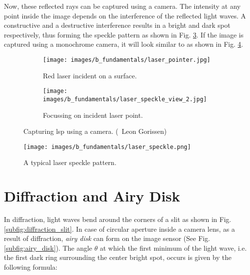     \noindent Now, these reflected rays can be captured using a camera. The intensity at any point inside the image depends on the interference of the reflected light waves. A constructive and a destructive interference results in a bright and dark spot respectively, thus forming the speckle pattern as shown in Fig. \ref{fig:img_leon}. If the image is captured using a monochrome camera, it will look similar to as shown in Fig. \ref{fig:laser_speckle.png}.

    \begin{figure}[h]
        \begin{subfigure}{0.5\textwidth}
            \centering
            \texttt{[image: images/b\_fundamentals/laser\_pointer.jpg]}
            \caption{Red laser incident on a surface.}
            \label{subfig:laser_pointer.jpg}
        \end{subfigure}
        \begin{subfigure}{0.5\textwidth}
            \centering
            \texttt{[image: images/b\_fundamentals/laser\_speckle\_view\_2.jpg]}
            \caption{Focussing on incident laser point.}
            \label{subfig:laser_speckle_view_2.jpg}
        \end{subfigure}
        \caption{Capturing \gls{lsp} using a camera. (\textcopyright \ Leon Gorissen) \cite{img_gorissen}}
        \label{fig:img_leon}
    \end{figure}
    
    \begin{figure}[h]
        \centering
        \texttt{[image: images/b\_fundamentals/laser\_speckle.png]}
        \caption{A typical laser speckle pattern.}
        \label{fig:laser_speckle.png}
    \end{figure}

    \section*{Diffraction and Airy Disk}\label{Section:Diffraction}

    In diffraction, light waves bend around the corners of a slit as shown in Fig. \ref{subfig:diffraction_slit}. In case of circular aperture inside a camera lens, as a result of diffraction, \emph{airy disk} can form on the image sensor (See Fig. \ref{subfig:airy_disk}). The angle $\theta$ at which the first minimum of the light wave, i.e. the first dark ring surrounding the center bright spot, occurs is given by the following formula:

